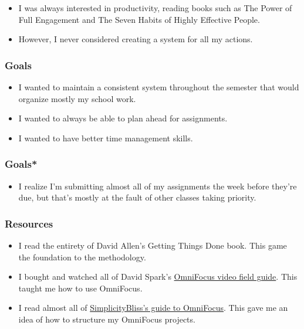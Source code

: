 \documentclass[xclolor=dvipsnames]{beamer}            %
\begin{document}
\begin{darkframes}
\begin{frame}
        \begin{itemize}
            \item I was always interested in productivity, reading books such as The Power of Full Engagement and The Seven Habits of Highly Effective People.
            \item However, I never considered creating a system for all my actions.
        \end{itemize}
    \end{frame}

    \begin{frame}
        \frametitle{Goals}

        \begin{itemize}
            \item I wanted to maintain a consistent system throughout the semester that would organize mostly my school work.
            \item I wanted to always be able to plan ahead for assignments.
            \item I wanted to have better time management skills.
        \end{itemize}
    \end{frame}

    \begin{frame}
        \frametitle{Goals*}

        \begin{itemize}
            \item I realize I'm submitting almost all of my assignments the week before they're due, but that's mostly at the fault of other classes taking priority.
        \end{itemize}
    \end{frame}

    \begin{frame}
        \frametitle{Resources}

        \begin{itemize}
            \item I read the entirety of David Allen's Getting Things Done book. This game the foundation to the methodology.
            \item I bought and watched all of David Spark's \href{https://www.macsparky.com/omnifocus/}{OmniFocus video field guide}. This taught me how to use OmniFocus.
            \item I read almost all of \href{https://simplicitybliss.com/essential-omnifocus-posts-cb5d7fd4bbd6}{SimplicityBliss's guide to OmniFocus}. This gave me an idea of how to structure my OmniFocus projects.
        \end{itemize}
    \end{frame}


\end{darkframes}
\end{document}
